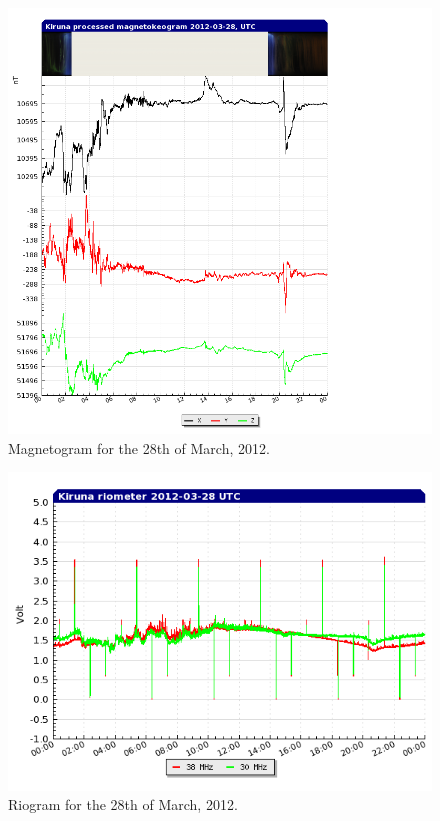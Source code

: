 \documentclass{article}
\begin{document}
\begin{figure}[htbp!]
\centering
\includegraphics[width=15cm]{Figures/magnetometer.png}
\caption{Magnetogram for the 28th of March, 2012.}
\label{fig:magnetometer}
\end{figure}

\begin{figure}[htbp!]
\centering
\centerline{\includegraphics[width=13cm]{Figures/riometer.png}}
\caption{Riogram for the 28th of March, 2012.}
\label{fig:riometer}
\end{figure}
\end{document}
